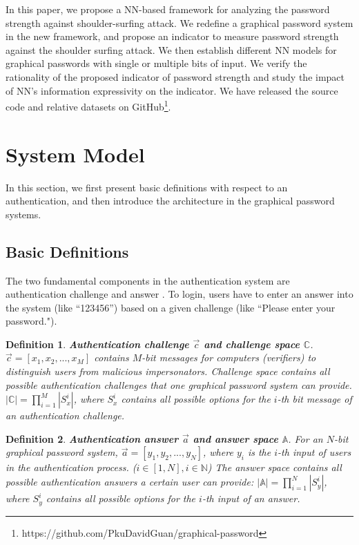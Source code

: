 \documentclass{article}
\newtheorem{definition}{Definition}
\begin{document}
In this paper, we propose a NN-based framework for analyzing the password strength against shoulder-surfing attack. We redefine a graphical password system in the new framework, and propose an indicator to measure password strength against the shoulder surfing attack. We then establish different NN models for graphical passwords with single or multiple bits of input. We verify the rationality of the proposed indicator of password strength and study the impact of NN's information expressivity on the indicator. We have released the source code and relative datasets on GitHub\footnote{https://github.com/PkuDavidGuan/graphical-password}.


\section{System Model}\label{sec:preliminaries}

In this section, we first present basic definitions with respect to an authentication, and then introduce the architecture in the graphical password systems.

\subsection{Basic Definitions}
The two fundamental components in the authentication system are authentication challenge and answer \cite{DBLP:journals/corr/BlockiBD14}. To
login, users have to enter an answer into the system (like ``123456'') based on a given challenge (like ``Please
enter your password.").
\begin{definition}
\textbf{Authentication challenge $\vec c$ and challenge space $\mathbb{C}$}. $\vec c = [x_1, x_2,...,x_M]$ contains $M$-bit messages for computers (verifiers) to distinguish users from malicious impersonators. Challenge space contains all possible authentication challenges that one graphical password system can provide.
$|\mathbb{C}| = \prod\limits_{i=1}^{M}|S_x^i|$,
where $S_x^i$ contains all possible options for the $i$-th bit message of an authentication challenge.
\end{definition}

\begin{definition}
\textbf{Authentication answer $\vec a$ and answer space $\mathbb{A}$}. For an $N$-bit graphical password system, $\vec a = [y_1, y_2,...,y_N]$,
where $y_i$ is the $i$-th input of users in the authentication process. ($i \in [1, N], i \in \mathbb{N}$)
The answer space contains all possible authentication answers a certain user can provide:
$|\mathbb{A}| = \prod\limits_{i=1}^{N}|S_y^i|$,
where $S_y^i$ contains all possible options for the $i$-th input of an answer. %
\end{definition}
\end{document}
